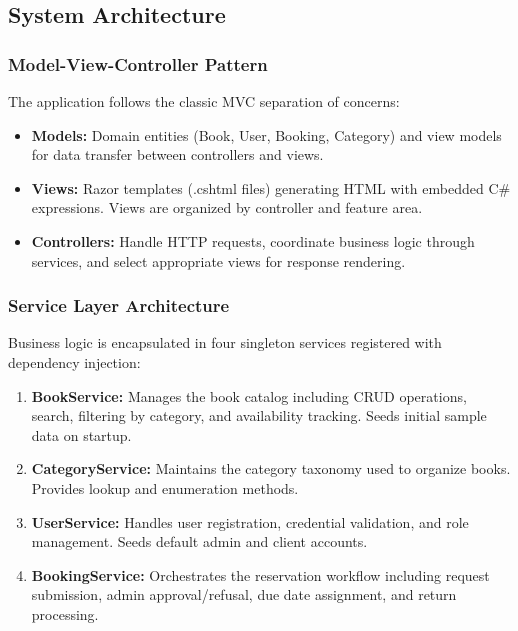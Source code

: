 \documentclass[12pt,a4paper]{article}
\begin{document}
\subsection{System Architecture}

\subsubsection{Model-View-Controller Pattern}

The application follows the classic MVC separation of concerns:

\begin{itemize}[leftmargin=*]
    \item \textbf{Models:} Domain entities (Book, User, Booking, Category) and view models for data transfer between controllers and views.
    
    \item \textbf{Views:} Razor templates (.cshtml files) generating HTML with embedded C\# expressions. Views are organized by controller and feature area.
    
    \item \textbf{Controllers:} Handle HTTP requests, coordinate business logic through services, and select appropriate views for response rendering.
\end{itemize}

\subsubsection{Service Layer Architecture}

Business logic is encapsulated in four singleton services registered with dependency injection:

\begin{enumerate}[leftmargin=*]
    \item \textbf{BookService:} Manages the book catalog including CRUD operations, search, filtering by category, and availability tracking. Seeds initial sample data on startup.
    
    \item \textbf{CategoryService:} Maintains the category taxonomy used to organize books. Provides lookup and enumeration methods.
    
    \item \textbf{UserService:} Handles user registration, credential validation, and role management. Seeds default admin and client accounts.
    
    \item \textbf{BookingService:} Orchestrates the reservation workflow including request submission, admin approval/refusal, due date assignment, and return processing.
\end{enumerate}
\end{document}
